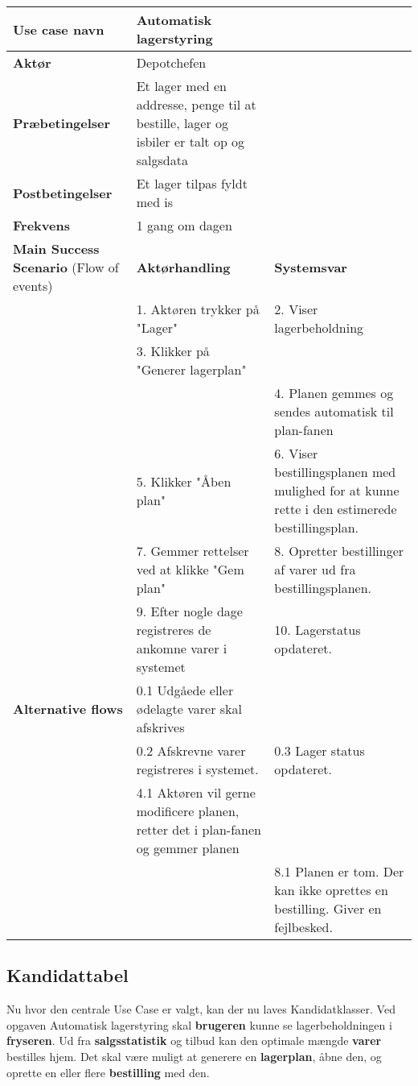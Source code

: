 \begin{longtable}{ |p{120pt}|p{120pt}|p{120pt}| }
    \hline
    \textbf{Use case navn} & Automatisk lagerstyring & \\
    \hline
    \textbf{Aktør} & Depotchefen & \\
    \hline
    \textbf{Præbetingelser} & Et lager med en addresse, penge til at bestille, lager og isbiler er talt op og salgsdata & \\
    \hline
    \textbf{Postbetingelser} & Et lager tilpas fyldt med is & \\
    \hline
    \textbf{Frekvens} & 1 gang om dagen & \\
    \hline
    \textbf{Main Success Scenario} (Flow of events) & \textbf{Aktørhandling} & \textbf{Systemsvar} \\
    \hline
    & 1. Aktøren trykker på "Lager" & 2. Viser lagerbeholdning \\
    \hline
    & 3. Klikker på "Generer lagerplan" &  \\
    & & 4. Planen gemmes og sendes automatisk til plan-fanen \\
    \hline
    & 5. Klikker "Åben plan" & 6. Viser bestillingsplanen med mulighed for at kunne rette i den estimerede bestillingsplan. \\
    \hline
    & 7. Gemmer rettelser ved at klikke "Gem plan" & 8. Opretter bestillinger af varer ud fra bestillingsplanen. \\
    \hline
    & 9. Efter nogle dage registreres de ankomne varer i systemet & 10. Lagerstatus opdateret. \\
    \hline
    \textbf{Alternative flows} & 0.1 Udgåede eller ødelagte varer skal afskrives & \\
    \hline
    & 0.2 Afskrevne varer registreres i systemet. & 0.3 Lager status opdateret. \\
    \hline
    & 4.1 Aktøren vil gerne modificere planen, retter det i plan-fanen og gemmer planen & \\
    \hline
    & & 8.1 Planen er tom. Der kan ikke oprettes en bestilling. Giver en fejlbesked. \\
    \hline
\end{longtable}

\subsection{Kandidattabel}
Nu hvor den centrale Use Case er valgt, kan der nu laves Kandidatklasser. 
Ved opgaven Automatisk lagerstyring skal \textbf{brugeren} kunne se lagerbeholdningen i \textbf{fryseren}. Ud fra \textbf{salgsstatistik} og tilbud kan den optimale mængde \textbf{varer} bestilles hjem. Det skal være muligt at generere en \textbf{lagerplan}, åbne den, og oprette en eller flere \textbf{bestilling} med den.

